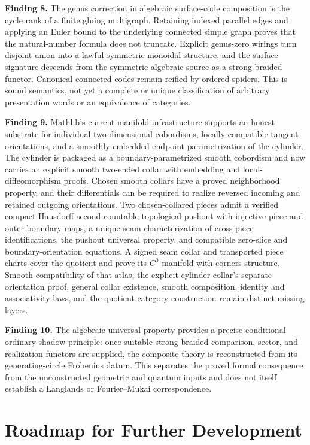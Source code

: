 \documentclass[11pt]{amsart}
\theoremstyle{plain}
\theoremstyle{definition}
\begin{document}
\textbf{Finding 8.} The genus correction in algebraic surface-code composition is the cycle rank of a finite gluing multigraph. Retaining indexed parallel edges and applying an Euler bound to the underlying connected simple graph proves that the natural-number formula does not truncate. Explicit genus-zero wirings turn disjoint union into a lawful symmetric monoidal structure, and the surface signature descends from the symmetric algebraic source as a strong braided functor. Canonical connected codes remain reified by ordered spiders. This is sound semantics, not yet a complete or unique classification of arbitrary presentation words or an equivalence of categories.

\textbf{Finding 9.} Mathlib's current manifold infrastructure supports an honest substrate for individual two-dimensional cobordisms, locally compatible tangent orientations, and a smoothly embedded endpoint parametrization of the cylinder. The cylinder is packaged as a boundary-parametrized smooth cobordism and now carries an explicit smooth two-ended collar with embedding and local-diffeomorphism proofs. Chosen smooth collars have a proved neighborhood property, and their differentials can be required to realize reversed incoming and retained outgoing orientations. Two chosen-collared pieces admit a verified compact Hausdorff second-countable topological pushout with injective piece and outer-boundary maps, a unique-seam characterization of cross-piece identifications, the pushout universal property, and compatible zero-slice and boundary-orientation equations. A signed seam collar and transported piece charts cover the quotient and prove its $C^0$ manifold-with-corners structure. Smooth compatibility of that atlas, the explicit cylinder collar's separate orientation proof, general collar existence, smooth composition, identity and associativity laws, and the quotient-category construction remain distinct missing layers.

\textbf{Finding 10.} The algebraic universal property provides a precise conditional ordinary-shadow principle: once suitable strong braided comparison, sector, and realization functors are supplied, the composite theory is reconstructed from its generating-circle Frobenius datum. This separates the proved formal consequence from the unconstructed geometric and quantum inputs and does not itself establish a Langlands or Fourier--Mukai correspondence.

\section{Roadmap for Further Development}
\label{sec:roadmap}
\end{document}
